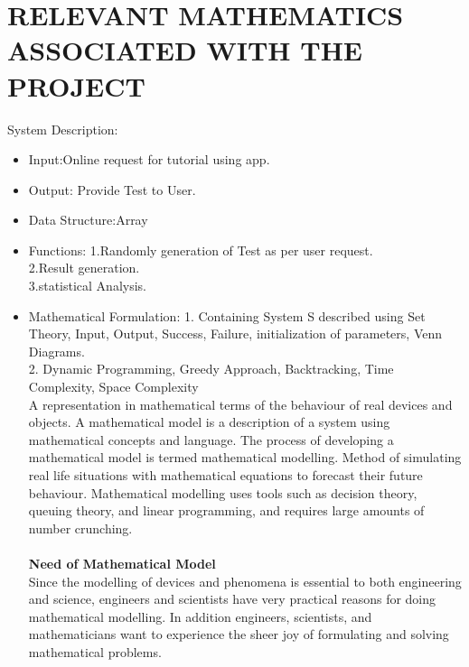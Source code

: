 \documentclass[oneside,a4paper,12pt]{report}
\begin{document}
{\section{RELEVANT MATHEMATICS ASSOCIATED WITH THE PROJECT}
System Description:\\ 
\begin{itemize}
\item Input:Online request for tutorial using app.
\item Output: Provide Test to User.
\item Data Structure:Array
\item Functions:
1.Randomly generation of Test as per user request.\\
\hspace*{0.8in}2.Result generation.\\
\hspace*{0.8in}3.statistical Analysis.\\ 
\item Mathematical Formulation:
\newline
\hspace*{0.3 in}1. Containing System S described using Set Theory, Input, Output, Success, Failure, initialization of parameters, Venn Diagrams.\\ 
\hspace*{0.3 in} 2. Dynamic Programming, Greedy Approach, Backtracking, Time Complexity, Space Complexity\\
\hspace*{0.3 in} A representation in mathematical terms of the behaviour of real devices and objects. A mathematical model is a description of a system using mathematical concepts and language. The process of developing a mathematical model is termed mathematical modelling. Method of simulating real life situations with mathematical equations to forecast their future behaviour. Mathematical modelling uses tools such as decision theory, queuing theory, and linear programming, and requires large amounts of number crunching.\\
\\
\textbf{Need of Mathematical Model}\\
\hspace*{0.3 in}Since the modelling of devices and phenomena is essential to both engineering and science, engineers and scientists have very practical reasons for doing mathematical modelling. In addition engineers, scientists, and mathematicians want to experience the sheer joy of formulating and solving mathematical problems.\\

\end{itemize}}
\end{document}
